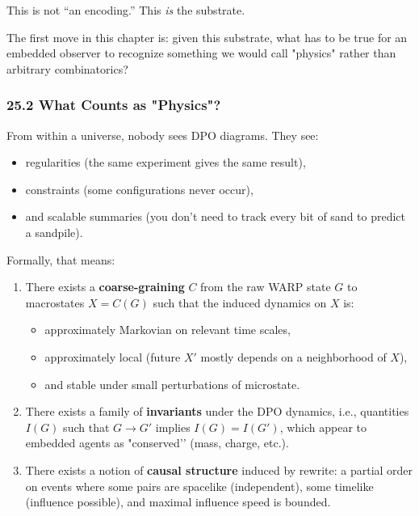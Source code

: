 This is not “an encoding.” This \emph{is} the substrate.

The first move in this chapter is: given this substrate, what has to be true
for an embedded observer to recognize something we would call
"physics" rather than arbitrary combinatorics?

\subsubsection*{25.2  What Counts as "Physics"?}

From within a universe, nobody sees DPO diagrams. They see:

\begin{itemize}
  \item regularities (the same experiment gives the same result),
  \item constraints (some configurations never occur),
  \item and scalable summaries (you don’t need to track every bit of sand to
        predict a sandpile).
\end{itemize}

Formally, that means:

\begin{enumerate}
  \item There exists a \textbf{coarse-graining} $C$ from the raw WARP state $G$
        to macrostates $X = C(G)$ such that the induced dynamics on $X$ is:
        \begin{itemize}
          \item approximately Markovian on relevant time scales,
          \item approximately local (future $X'$ mostly depends on a neighborhood of $X$),
          \item and stable under small perturbations of microstate.
        \end{itemize}

  \item There exists a family of \textbf{invariants} under the DPO dynamics,
        i.e., quantities $I(G)$ such that $G \to G'$ implies $I(G) = I(G')$,
        which appear to embedded agents as "conserved’’ (mass, charge, etc.).

  \item There exists a notion of \textbf{causal structure} induced by rewrite:
        a partial order on events where some pairs are spacelike (independent),
        some timelike (influence possible), and maximal influence speed is bounded.
\end{enumerate}

